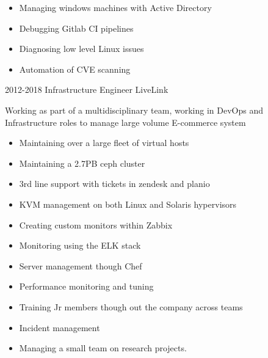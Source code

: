 \documentclass[]{friggeri-cv-a4}
\begin{document}
\begin{entrylist}
{\begin{itemize}
        \item Managing windows machines with Active Directory
        \item Debugging Gitlab CI pipelines
        \item Diagnosing low level Linux issues
        \item Automation of CVE scanning
      \end{itemize}
    }
  \entry
  	{2012-2018}
  	{Infrastructure Engineer}
  	{LiveLink}
  	{
      Working as part of a multidisciplinary team, working in DevOps and Infrastructure roles to manage large volume E-commerce system
    \begin{itemize}
      \item Maintaining over a large fleet of virtual hosts
      \item Maintaining a 2.7PB ceph cluster
      \item 3rd line support with tickets in zendesk and planio
      \item KVM management on both Linux and Solaris hypervisors
      \item Creating custom monitors within Zabbix
      \item Monitoring using the ELK stack
      \item Server management though Chef
      \item Performance monitoring and tuning
      \item Training Jr members though out the company across teams
      \item Incident management
      \item Managing a small team on research projects.
    \end{itemize}
    }
 \end{entrylist}
\end{document}
